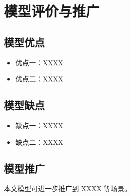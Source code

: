 \section{模型评价与推广}

\subsection{模型优点}
\begin{itemize}
    \item 优点一：XXXX
    \item 优点二：XXXX
\end{itemize}

\subsection{模型缺点}
\begin{itemize}
    \item 缺点一：XXXX
    \item 缺点二：XXXX
\end{itemize}

\subsection{模型推广}
本文模型可进一步推广到 XXXX 等场景。
